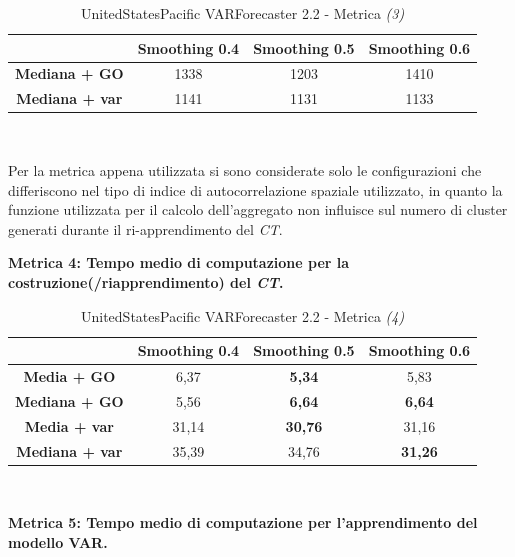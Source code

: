 \documentclass[12pt,a4paper,oneside,openright]{book}
\begin{document}
\medskip

\begin{table}[H]
\centering
\begin{tabular}[H]{|c|c|c|c|}
\hline
& Smoothing 0.4 & Smoothing 0.5 & Smoothing 0.6\\
\hline
\textbf{Mediana + GO} & 1338 & 1203 & 1410\\ 
\hline
\textbf{Mediana + var} & 1141 & 1131 & 1133\\ 
\hline
\end{tabular} \\
\caption{UnitedStatesPacific VARForecaster 2.2 - Metrica \textit{(3)}}
\end{table}

\medskip

Per la metrica appena utilizzata si sono considerate solo le configurazioni che differiscono nel tipo di indice di autocorrelazione spaziale utilizzato, in quanto la funzione utilizzata per il calcolo dell'aggregato non influisce sul numero di cluster generati durante il ri-apprendimento del \textit{CT}.

\newpage

\textbf{Metrica 4: Tempo medio di computazione per la costruzione(/riapprendimento) del \textit{CT}.}

\medskip

\begin{table}[H]
\centering
\begin{tabular}[H]{|c|c|c|c|}
\hline
& Smoothing 0.4 & Smoothing 0.5 & Smoothing 0.6\\
\hline
\textbf{Media + GO} & 6,37 & \textbf{5,34} & 5,83\\ 
\hline
\textbf{Mediana + GO} & 5,56 & \textbf{6,64} & \textbf{6,64}\\ 
\hline
\textbf{Media + var} & 31,14 & \textbf{30,76} & 31,16\\ 
\hline
\textbf{Mediana + var} & 35,39 & 34,76 & \textbf{31,26}\\ 
\hline
\end{tabular} \\
\caption{UnitedStatesPacific VARForecaster 2.2 - Metrica \textit{(4)}}
\end{table}

\medskip

\textbf{Metrica 5: Tempo medio di computazione per l'apprendimento del modello VAR.}

\medskip
\end{document}
